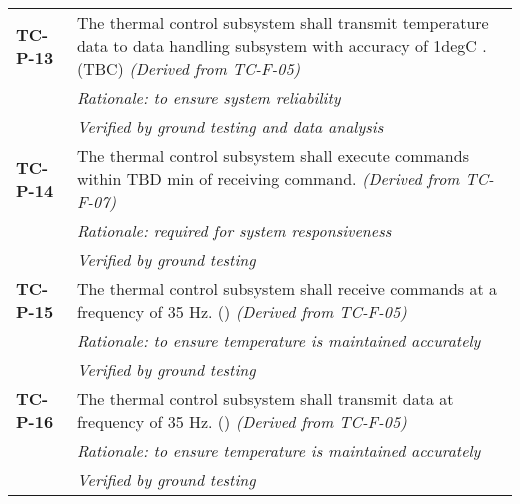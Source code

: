 \begin{longtable}{P{2cm}P{13.25cm}}
\textbf{TC-P-13}	& The thermal control subsystem shall transmit temperature data to data handling subsystem with accuracy of 1\gls{degC} \cite{temp_sensors}. (\gls{TBC}) \textit{(Derived from TC-F-05)} \\
 & \textit{Rationale: to ensure system reliability} \\
 & \textit{Verified by ground testing and data analysis}		\\
 
\textbf{TC-P-14}	& The thermal control subsystem shall execute commands within \gls{TBD} \gls{min} of receiving command. \textit{(Derived from TC-F-07)}\\
 & \textit{Rationale: required for system responsiveness} \\
 &  \textit{Verified by ground testing}								\\
 
\textbf{TC-P-15}	& The thermal control subsystem shall receive commands at a frequency of 35 \gls{Hz}. (\textit{}) \textit{(Derived from TC-F-05)} \\
 & \textit{Rationale: to ensure temperature is maintained accurately} \\
 &  \textit{Verified by ground testing}	\\

\textbf{TC-P-16}	& The thermal control subsystem shall transmit data at frequency of 35 \gls{Hz}. (\textit{})
\textit{(Derived from TC-F-05)} \\
 & \textit{Rationale: to ensure temperature is maintained accurately} \\
 &  \textit{Verified by ground testing}	
\end{longtable}